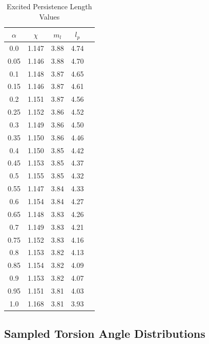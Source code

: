 \begin{table}[hbt!]\centering
\caption{Excited Persistence Length Values}
\label{tab:e_lp}
\renewcommand{\arraystretch}{1.5}
\begin{threeparttable}
\begin{tabular}{ccccc}\toprule
\multicolumn{1}{c}{\multirow{1}{3.5cm}{\centering $\alpha$}} &
\multicolumn{1}{c}{\multirow{1}{1.5cm}{\centering $\chi$}} &
\multicolumn{1}{c}{\multirow{1}{1.5cm}{\centering $m_l$}} &
\multicolumn{1}{c}{\multirow{1}{1.5cm}{\centering $l_p$}} & \\ \midrule
    0.0 & 1.147 & 3.88 & 4.74\\
    0.05 & 1.146 & 3.88 & 4.70\\
    0.1 & 1.148 & 3.87 & 4.65\\
    0.15 & 1.146 & 3.87 & 4.61\\
    0.2 & 1.151 & 3.87 & 4.56\\
    0.25 & 1.152 & 3.86 & 4.52\\
    0.3 & 1.149 & 3.86 & 4.50\\
    0.35 & 1.150 & 3.86 & 4.46\\
    0.4 & 1.150 & 3.85 & 4.42\\
    0.45 & 1.153 & 3.85 & 4.37\\
    0.5 & 1.155 & 3.85 & 4.32\\
    0.55 & 1.147 & 3.84 & 4.33\\
    0.6 & 1.154 & 3.84 & 4.27\\
    0.65 & 1.148 & 3.83 & 4.26\\
    0.7 & 1.149 & 3.83 & 4.21\\
    0.75 & 1.152 & 3.83 & 4.16\\
    0.8 & 1.153 & 3.82 & 4.13\\
    0.85 & 1.154 & 3.82 & 4.09\\
    0.9 & 1.153 & 3.82 & 4.07\\
    0.95 & 1.151 & 3.81 & 4.03\\
    1.0 & 1.168 & 3.81 & 3.93\\ \bottomrule
\end{tabular}
\begin{tablenotes}
\item
\end{tablenotes}
\end{threeparttable}
\end{table}

\clearpage
\subsection{Sampled Torsion Angle Distributions}

